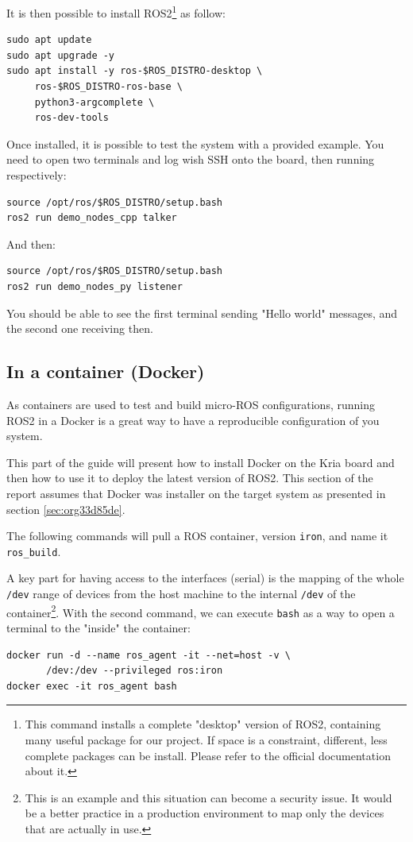 \documentclass[10pt]{article}
\begin{document}
It is then possible to install ROS2\footnote{This command installs a complete "desktop" version of ROS2, containing many
useful package for our project.
If space is a constraint, different, less complete packages can be install.
Please refer to the official documentation about it.} as follow:
\begin{verbatim}
sudo apt update
sudo apt upgrade -y
sudo apt install -y ros-$ROS_DISTRO-desktop \
     ros-$ROS_DISTRO-ros-base \
     python3-argcomplete \
     ros-dev-tools
\end{verbatim}

Once installed, it is possible to test the system with a provided example.
You need to open two terminals and log wish SSH onto the board, then running
respectively:
\begin{verbatim}
source /opt/ros/$ROS_DISTRO/setup.bash
ros2 run demo_nodes_cpp talker
\end{verbatim}

And then:
\begin{verbatim}
source /opt/ros/$ROS_DISTRO/setup.bash
ros2 run demo_nodes_py listener
\end{verbatim}

You should be able to see the first terminal sending "Hello world" messages,
and the second one receiving then.

\subsection{In a container (Docker)}
\label{sec:org1c93c07}
As containers are used to test and build micro-ROS configurations,
running ROS2 in a Docker  is a great way to have a reproducible configuration
of you system.

This part of the guide will present how to install Docker on the
Kria board and then how to use it to deploy the latest version of ROS2.
This section of the report assumes that Docker was installer on the target system
as presented in section \ref{sec:org33d85de}.

The following commands will pull a ROS container, version \texttt{iron}, and name it \texttt{ros\_build}.

A key part for having access to the interfaces (serial) is the mapping of the whole \texttt{/dev}
range of devices from the host machine to the internal \texttt{/dev} of the container\footnote{This is an example and this situation can become a security issue. It would be a better practice
in a production environment to map only the devices that are actually in use.}.
With the second command, we can execute \texttt{bash} as a way to open a terminal to the "inside" the container:
\begin{verbatim}
docker run -d --name ros_agent -it --net=host -v \
       /dev:/dev --privileged ros:iron
docker exec -it ros_agent bash
\end{verbatim}
\end{document}
